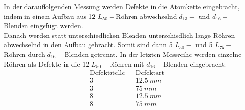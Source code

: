 In der darauffolgenden Messung werden Defekte in die Atomkette eingebracht, indem in einem Aufbau aus 12 $L_{50}-$Röhren abwechselnd $d_{13}-$ und $d_{16}-$Blenden eingefügt werden.\\
%
Danach werden statt unterschiedlichen Blenden unterschiedlich lange Röhren abwechselnd in den Aufbau gebracht.
Somit sind dann 5 $L_{50}-$ und 5 $L_{75}-$ Röhren durch $d_{16}-$Blenden getrennt.
%
In der letzten Messreihe werden einzelne Röhren als Defekte in die 12 $L_{50}-$Röhren mit $d_{16}-$Blenden eingebracht:
\begin{align*}
\text{Defektstelle} && \text{Defektart}  \\
    3               &&   \SI{12.5}{mm}   \\
    3               &&   \SI{75}{mm}     \\
    8               &&   \SI{12.5}{mm}   \\
    8               &&   \SI{75}{mm}   . \\
\end{align*}
%
